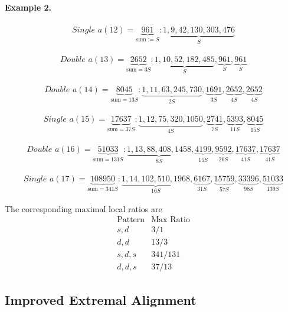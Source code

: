 \documentclass[12pt, oneside]{article}
\numberwithin{equation}{section}
\theoremstyle{definition}
\theoremstyle{plain}
\theoremstyle{remark}
\begin{document}
\paragraph{Example 2.}
\[
\begin{array}{l}
\textit{Single } a(12) = \underbrace{961}_{\text{sum} := S}:
\underbrace{1,9,42,130,303,476}_{S}
\end{array}
\]

\[
\begin{array}{l}
\textit{Double } a(13) = \underbrace{2652}_{\text{sum} = 3S}:
\underbrace{1,10,52,182,485}_{S},
\underbrace{961}_{S},
\underbrace{961}_{S}
\end{array}
\]

\[
\begin{array}{l}
\textit{Double } a(14) = \underbrace{8045}_{\text{sum} = 13S}:
\underbrace{1,11,63,245,730}_{2S},
\underbrace{1691}_{3S},
\underbrace{2652}_{4S},
\underbrace{2652}_{4S}
\end{array}
\]

\[
\begin{array}{l}
\textit{Single } a(15) = \underbrace{17637}_{\text{sum} = 37S}:
\underbrace{1,12,75,320,1050}_{4S},
\underbrace{2741}_{7S},
\underbrace{5393}_{11S},
\underbrace{8045}_{15S}
\end{array}
\]

\[
\begin{array}{l}
\textit{Double } a(16) = \underbrace{51033}_{\text{sum} = 131S}:
\underbrace{1,13,88,408,1458}_{8S},
\underbrace{4199}_{15S},
\underbrace{9592}_{26S},
\underbrace{17637}_{41S},
\underbrace{17637}_{41S}
\end{array}
\]

\[
\begin{array}{l}
\textit{Single } a(17) = \underbrace{108950}_{\text{sum} = 341S}:
\underbrace{1,14,102,510,1968}_{16S},
\underbrace{6167}_{31S},
\underbrace{15759}_{57S},
\underbrace{33396}_{98S},
\underbrace{51033}_{139S}
\end{array}
\]

The corresponding maximal local ratios are
\[
\begin{array}{c|c}
\text{Pattern} & \text{Max Ratio} \\
\hline
s,d & 3/1 \\
d,d & 13/3 \\
s,d,s & 341/131 \\
d,d,s & 37/13
\end{array}
\]

\subsection*{Improved Extremal Alignment}
\end{document}
